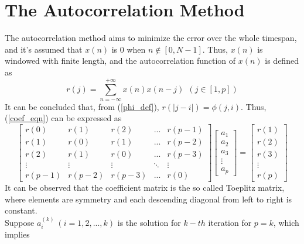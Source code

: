 \documentclass[preprint,12pt]{elsarticle}
\begin{document}
\section{The Autocorrelation Method}\label{S:2}
The autocorrelation method aims to minimize the error over the whole timespan, and it's assumed that $x(n)$ is 0 when $n \notin [0,N-1]$. Thus, $x(n)$ is windowed with finite length, and the autocorrelation function of $x(n)$ is defined as
\begin{equation}
	r(j) = \sum_{n=-\infty}^{+\infty} x(n)x(n-j) \ \ (j \in [1, p])
\end{equation}
It can be concluded that, from (\ref{phi_def}), $r(|j-i|) = \phi(j, i)$. Thus, (\ref{coef_eqn}) can be expressed as
\begin{equation}
	\begin{bmatrix}
		r(0) & r(1) & r(2) & ... & r(p-1) \\ 
		r(1) & r(0) & r(1) & ... & r(p-2) \\
		r(2) & r(1) & r(0) & ... & r(p-3) \\
		\vdots & \vdots & \vdots & \ddots & \vdots \\
		r(p-1) & r(p-2) & r(p-3) & ... & r(0)
	\end{bmatrix}
	\begin{bmatrix}
	a_1 \\ a_2 \\ a_3 \\ \vdots \\ a_p
	\end{bmatrix}
	=
	\begin{bmatrix}
		r(1) \\ r(2) \\ r(3) \\ \vdots \\ r(p)
	\end{bmatrix}
\end{equation}
It can be observed that the coefficient matrix is the so called Toeplitz matrix, where elements are symmetry and  each descending diagonal from left to right is constant.\\
Suppose $a_i^{(k)} \ (i=1, 2, ... ,k)$ is the solution for $k-th$ iteration for $p=k$, which implies
\end{document}
